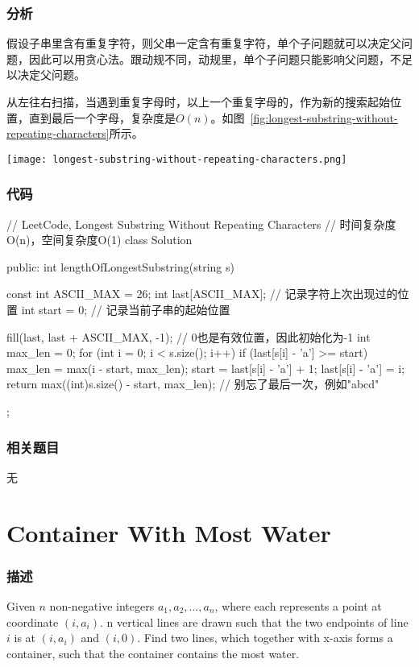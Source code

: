 \subsubsection{分析}
假设子串里含有重复字符，则父串一定含有重复字符，单个子问题就可以决定父问题，因此可以用贪心法。跟动规不同，动规里，单个子问题只能影响父问题，不足以决定父问题。

从左往右扫描，当遇到重复字母时，以上一个重复字母的，作为新的搜索起始位置，直到最后一个字母，复杂度是$O(n)$。如图~\ref{fig:longest-substring-without-repeating-characters}所示。

\begin{center}
	\texttt{[image: longest-substring-without-repeating-characters.png]}\\
	\label{fig:longest-substring-without-repeating-characters}
\end{center}


\subsubsection{代码}
\begin{Code}
	// LeetCode, Longest Substring Without Repeating Characters
	// 时间复杂度O(n)，空间复杂度O(1)
	class Solution {
		public:
		int lengthOfLongestSubstring(string s) {
			const int ASCII_MAX = 26;
			int last[ASCII_MAX]; // 记录字符上次出现过的位置
			int start = 0; // 记录当前子串的起始位置
			
			fill(last, last + ASCII_MAX, -1); // 0也是有效位置，因此初始化为-1
			int max_len = 0;
			for (int i = 0; i < s.size(); i++) {
				if (last[s[i] - 'a'] >= start) {
					max_len = max(i - start, max_len);
					start = last[s[i] - 'a'] + 1;
				}
				last[s[i] - 'a'] = i;
			}
			return max((int)s.size() - start, max_len);  // 别忘了最后一次，例如"abcd"
		}
	};
\end{Code}


\subsubsection{相关题目}
\begindot
\item 无
\myenddot


\section{Container With Most Water}
\label{sec:container-with-most-water}


\subsubsection{描述}
Given $n$ non-negative integers $a_1, a_2, ..., a_n$, where each represents a point at coordinate $(i, a_i)$. n vertical lines are drawn such that the two endpoints of line $i$ is 
at $(i, a_i)$ and $(i, 0)$. Find two lines, which together with x-axis forms a container, such that the container contains the most water.

